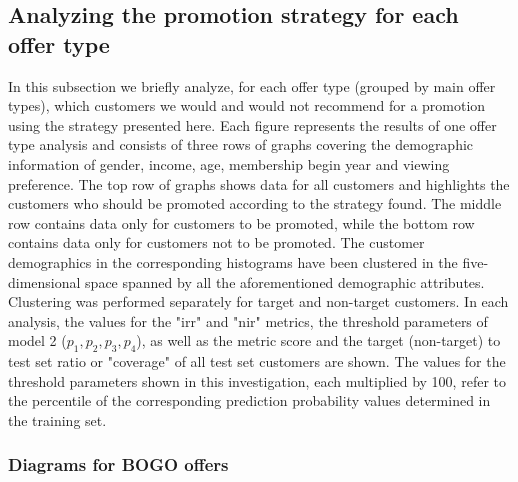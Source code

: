 \documentclass[11pt]{article} %
\begin{document}
\subsection{Analyzing the promotion strategy for each offer type}
In this subsection we briefly analyze, for each offer type (grouped by main offer types), which customers we would and would not recommend for a promotion using the strategy presented here.
Each figure represents the results of one offer type analysis and consists of three rows of graphs covering the demographic information of gender, income, age, membership begin year and viewing preference.
The top row of graphs shows data for all customers and highlights the customers who should be promoted according to the strategy found.
The middle row contains data only for customers to be promoted, while the bottom row contains data only for customers not to be promoted.
The customer demographics in the corresponding histograms have been clustered in the five-dimensional space spanned by all the aforementioned demographic attributes. Clustering was performed separately for target and non-target customers. In each analysis, the values for the "irr" and "nir" metrics, the threshold parameters of model 2 ($p_1, p_2, p_3, p_4$), as well as the metric score and the target (non-target) to test set ratio or "coverage" of all test set customers are shown.
The values for the threshold parameters shown in this investigation, each multiplied by 100, refer to the percentile of the corresponding prediction probability values determined in the training set.

\subsubsection{Diagrams for BOGO offers}
\end{document}
